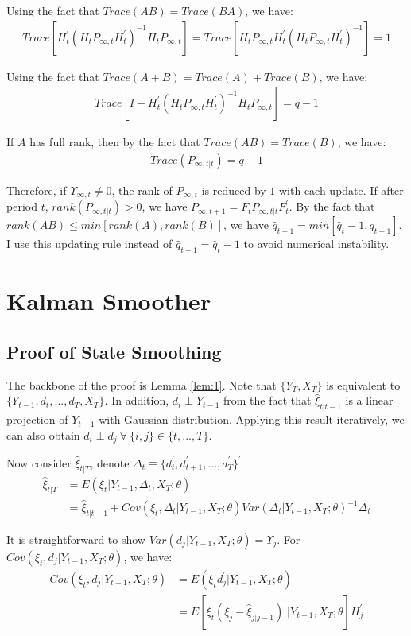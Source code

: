 \documentclass[10pt]{article}
\numberwithin{equation}{section}
\begin{document}
Using the fact that $Trace(AB)=Trace(BA)$, we have:
\begin{align*}
    Trace[H_t^{'}(H_tP_{\infty,t}H_t^{'})^{-1}H_tP_{\infty,t}] = Trace[H_tP_{\infty,t}H_t^{'}(H_tP_{\infty,t}H_t^{'})^{-1}] = 1
\end{align*}

Using the fact that $Trace(A+B) = Trace(A) + Trace(B)$, we have:
\begin{align*}
    Trace[I - H_t^{'}(H_tP_{\infty,t}H_t^{'})^{-1}H_tP_{\infty,t}]=q-1
\end{align*}

If $A$ has full rank, then by the fact that $Trace(AB)=Trace(B)$, we have:
\begin{align*}
    Trace(P_{\infty,t|t}) = q-1
\end{align*}

Therefore, if $\Upsilon_{\infty,t}\neq0$, the rank of $P_{\infty,t}$ is reduced by $1$ with each update. If after period $t$, $rank(P_{\infty,t|t})>0$, we have $P_{\infty,t+1} = F_tP_{\infty,t|t}F_t^{'}$. By the fact that $rank(AB)\leq min[rank(A), rank(B)]$, we have $\hat{q}_{t+1}=min[\hat{q}_t-1,q_{t+1}]$. I use this updating rule instead of $\hat{q}_{t+1} = \hat{q}_t-1$ to avoid numerical instability. 

\section{Kalman Smoother}
\subsection{Proof of State Smoothing} \label{ap:smooth}
The backbone of the proof is Lemma \ref{lem:1}. Note that $\{Y_T, X_T\}$ is equivalent to $\{Y_{t-1},d_t,...,d_T, X_T\}$. In addition, $d_i \perp Y_{t-1}$ from the fact that $\hat{\xi}_{t|t-1}$ is a linear projection of $Y_{t-1}$ with Gaussian distribution. Applying this result iteratively, we can also obtain $d_i \perp d_j \:\forall\: \{i,j\} \in \{t,...,T\}$.

Now consider $\hat{\xi}_{t|T}$, denote $\Delta_t\equiv\{d_t^{'},d_{t+1}^{'},...,d_T^{'}\}^{'}$ 
\begin{align*}
    \hat{\xi}_{t|T} &= E(\xi_t|Y_{t-1},\Delta_{t},X_T;\theta) \\
    &= \hat{\xi}_{t|t-1} + Cov(\xi_t,\Delta_t|Y_{t-1},X_T;\theta)Var(\Delta_t|Y_{t-1},X_T;\theta)^{-1}\Delta_t
\end{align*}

It is straightforward to show $Var(d_j|Y_{t-1},X_T;\theta)=\Upsilon_j$. For $Cov(\xi_t,d_j|Y_{t-1},X_T;\theta)$, we have:
\begin{align*}
    Cov(\xi_t,d_j|Y_{t-1},X_T;\theta) &= E(\xi_td_j^{'}|Y_{t-1},X_T;\theta) \\
    &= E[\xi_t(\xi_j-\hat{\xi}_{j|j-1})^{'}|Y_{t-1},X_T;\theta]H_j^{'} 
\end{align*}
\end{document}
